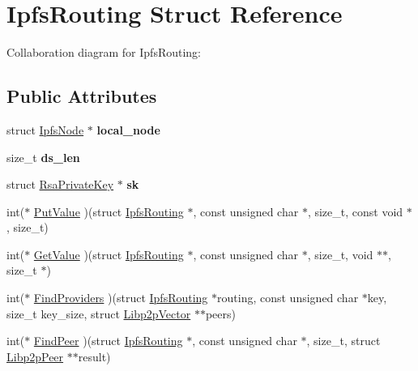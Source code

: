 \hypertarget{struct_ipfs_routing}{}\section{Ipfs\+Routing Struct Reference}
\label{struct_ipfs_routing}


Collaboration diagram for Ipfs\+Routing\+:
\subsection*{Public Attributes}
\begin{DoxyCompactItemize}
\item 
\mbox{\label{struct_ipfs_routing_ae1708cb3d50aa163ebfaa297cbbfafe4}} 
struct \mbox{\hyperlink{struct_ipfs_node}{Ipfs\+Node}} $\ast$ {\bfseries local\+\_\+node}
\item 
\mbox{\label{struct_ipfs_routing_a35d80ab136cb81c104655e313be7aae9}} 
size\+\_\+t {\bfseries ds\+\_\+len}
\item 
\mbox{\label{struct_ipfs_routing_afa2e7ff725a80e20a0ad310e6f7a5c2b}} 
struct \mbox{\hyperlink{struct_rsa_private_key}{Rsa\+Private\+Key}} $\ast$ {\bfseries sk}
\item 
int($\ast$ \mbox{\hyperlink{struct_ipfs_routing_af24b01a157cb630156caece339bfc8ae}{Put\+Value}} )(struct \mbox{\hyperlink{struct_ipfs_routing}{Ipfs\+Routing}} $\ast$, const unsigned char $\ast$, size\+\_\+t, const void $\ast$, size\+\_\+t)
\item 
int($\ast$ \mbox{\hyperlink{struct_ipfs_routing_a6ae480b788a12725f4c8806d7046a526}{Get\+Value}} )(struct \mbox{\hyperlink{struct_ipfs_routing}{Ipfs\+Routing}} $\ast$, const unsigned char $\ast$, size\+\_\+t, void $\ast$$\ast$, size\+\_\+t $\ast$)
\item 
int($\ast$ \mbox{\hyperlink{struct_ipfs_routing_a94e1c1810459db593ef60cb2bea4c3f4}{Find\+Providers}} )(struct \mbox{\hyperlink{struct_ipfs_routing}{Ipfs\+Routing}} $\ast$routing, const unsigned char $\ast$key, size\+\_\+t key\+\_\+size, struct \mbox{\hyperlink{struct_libp2p_vector}{Libp2p\+Vector}} $\ast$$\ast$peers)
\item 
int($\ast$ \mbox{\hyperlink{struct_ipfs_routing_a74a86860bbd48c4f7425b4da88724116}{Find\+Peer}} )(struct \mbox{\hyperlink{struct_ipfs_routing}{Ipfs\+Routing}} $\ast$, const unsigned char $\ast$, size\+\_\+t, struct \mbox{\hyperlink{struct_libp2p_peer}{Libp2p\+Peer}} $\ast$$\ast$result)
$$
\end{DoxyCompactItemize}
